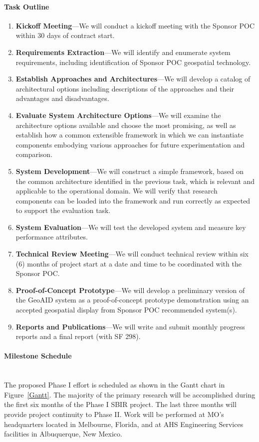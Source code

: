 \documentclass{sbir}
\begin{document}
\paragraph{Task Outline} 
\begin{enumerate}
\vspace{-0.1in}
\item {\bf Kickoff Meeting}---We will conduct a kickoff meeting with the Sponsor POC within 30 days of contract start.
\item {\bf Requirements Extraction}---We will identify and enumerate system requirements, including identification of Sponsor POC geospatial technology.
\item {\bf Establish Approaches and Architectures}---We will develop a catalog of architectural options including descriptions of the approaches and their advantages and disadvantages.
\item {\bf Evaluate System Architecture Options}---We will examine the architecture options available and choose the most promising, as well as establish how a common extensible framework in which we can instantiate components embodying various approaches for future experimentation and comparison.
\item {\bf System Development}---We will construct a simple framework, based on the common architecture identified in the previous task, which is relevant and applicable to the operational domain. We will verify that research components can be loaded into the framework and run correctly as expected to support the evaluation task.
\item {\bf System Evaluation}---We will test the developed system and measure key performance attributes.
\item {\bf Technical Review Meeting}---We will conduct technical review within six (6) months of project start at a date and time to be coordinated with the Sponsor POC.
\item {\bf Proof-of-Concept Prototype}---We will develop a preliminary version of the GeoAID system as a proof-of-concept prototype demonstration using an accepted geospatial display from Sponsor POC recommended system(s).
\item {\bf Reports and Publications}---We will write and submit monthly progress reports and a final report (with SF 298).
\end{enumerate}

\paragraph{Milestone Schedule}~\\
The proposed Phase I effort is scheduled as shown in the Gantt chart in Figure~\ref{Gantt}. The majority of the primary research will be accomplished during the first six months of the Phase I SBIR project. The last three months will provide project continuity to Phase II. Work will be performed at MO's headquarters located in Melbourne, Florida, and at AHS Engineering Services facilities in Albuquerque, New Mexico.
\end{document}
